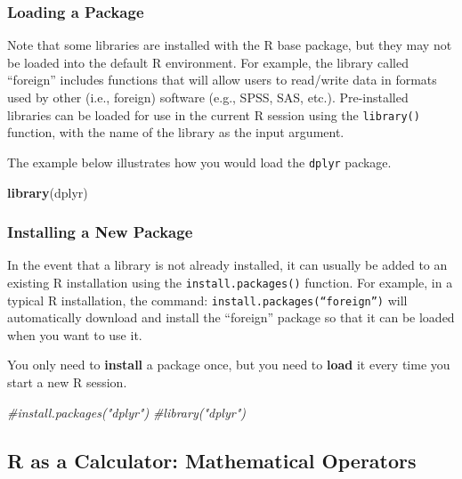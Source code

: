 \documentclass[
  11pt,
]{article}
\newenvironment{Shaded}{\begin{snugshade}}{\end{snugshade}}
\newcommand{\CommentTok}[1]{\textcolor[rgb]{0.56,0.35,0.01}{\textit{#1}}}
\newcommand{\FunctionTok}[1]{\textcolor[rgb]{0.13,0.29,0.53}{\textbf{#1}}}
\newcommand{\NormalTok}[1]{#1}
\begin{document}
\subsubsection{Loading a Package}\label{loading-a-package}

Note that some libraries are installed with the R base package, but they
may not be loaded into the default R environment. For example, the
library called ``foreign'' includes functions that will allow users to
read/write data in formats used by other (i.e., foreign) software (e.g.,
SPSS, SAS, etc.). Pre-installed libraries can be loaded for use in the
current R session using the \texttt{library()} function, with the name
of the library as the input argument.

The example below illustrates how you would load the \texttt{dplyr}
package.

\begin{Shaded}
\begin{Highlighting}[]
\FunctionTok{library}\NormalTok{(dplyr)}
\end{Highlighting}
\end{Shaded}

\subsubsection{Installing a New Package}\label{installing-a-new-package}

In the event that a library is not already installed, it can usually be
added to an existing R installation using the
\texttt{install.packages()} function. For example, in a typical R
installation, the command: \texttt{install.packages(“foreign”)} will
automatically download and install the ``foreign'' package so that it
can be loaded when you want to use it.

You only need to \textbf{install} a package once, but you need to
\textbf{load} it every time you start a new R session.

\begin{Shaded}
\begin{Highlighting}[]
\CommentTok{\#install.packages("dplyr") }
\CommentTok{\#library("dplyr")}
\end{Highlighting}
\end{Shaded}

\subsection{R as a Calculator: Mathematical
Operators}\label{r-as-a-calculator-mathematical-operators}
\end{document}
